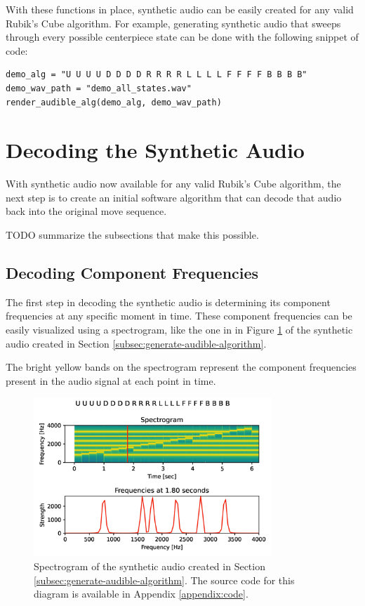 With these functions in place, synthetic audio can be easily created for any valid Rubik's Cube algorithm. For example, generating synthetic audio that sweeps through every possible centerpiece state can be done with the following snippet of code:

\begin{verbatim}
demo_alg = "U U U U D D D D R R R R L L L L F F F F B B B B"
demo_wav_path = "demo_all_states.wav"
render_audible_alg(demo_alg, demo_wav_path)
\end{verbatim}


\section{Decoding the Synthetic Audio}
\label{sec:decoding-synthetic-audio}
With synthetic audio now available for any valid Rubik's Cube algorithm, the next step is to create an initial software algorithm that can decode that audio back into the original move sequence.

TODO summarize the subsections that make this possible.

\subsection{Decoding Component Frequencies}
\label{subsec:decode-component-frequencies}
The first step in decoding the synthetic audio is determining its component frequencies at any specific moment in time.
These component frequencies can be easily visualized using a spectrogram, like the one in in Figure \ref{fig:spectrogram} of the synthetic audio created in Section \ref{subsec:generate-audible-algorithm}.

The bright yellow bands on the spectrogram represent the component frequencies present in the audio signal at each point in time.

\begin{figure}
    \centering
    \includegraphics[width=0.8\textwidth]{Figures/5 Algorithm Design/component_frequencies.png}
    \caption{Spectrogram of the synthetic audio created in Section \ref{subsec:generate-audible-algorithm}. The source code for this diagram is available in Appendix \ref{appendix:code}.}
    \label{fig:spectrogram}
\end{figure}


